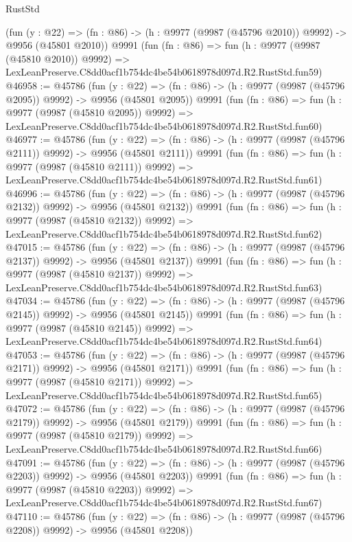 \begin{lexlean}{RustStd}
\begin{coremodule}
    (fun (y : @22) =>
    (fn : @86) -> (h : @9977 (@9987 (@45796 @2010)) @9992) -> @9956 (@45801 @2010))
    @9991
    (fun (fn : @86) =>
    fun (h : @9977 (@9987 (@45810 @2010)) @9992) =>
    LexLeanPreserve.C8dd0acf1b754dc4be54b0618978d097d.R2.RustStd.fun59)
@46958 := @45786
    (fun (y : @22) =>
    (fn : @86) -> (h : @9977 (@9987 (@45796 @2095)) @9992) -> @9956 (@45801 @2095))
    @9991
    (fun (fn : @86) =>
    fun (h : @9977 (@9987 (@45810 @2095)) @9992) =>
    LexLeanPreserve.C8dd0acf1b754dc4be54b0618978d097d.R2.RustStd.fun60)
@46977 := @45786
    (fun (y : @22) =>
    (fn : @86) -> (h : @9977 (@9987 (@45796 @2111)) @9992) -> @9956 (@45801 @2111))
    @9991
    (fun (fn : @86) =>
    fun (h : @9977 (@9987 (@45810 @2111)) @9992) =>
    LexLeanPreserve.C8dd0acf1b754dc4be54b0618978d097d.R2.RustStd.fun61)
@46996 := @45786
    (fun (y : @22) =>
    (fn : @86) -> (h : @9977 (@9987 (@45796 @2132)) @9992) -> @9956 (@45801 @2132))
    @9991
    (fun (fn : @86) =>
    fun (h : @9977 (@9987 (@45810 @2132)) @9992) =>
    LexLeanPreserve.C8dd0acf1b754dc4be54b0618978d097d.R2.RustStd.fun62)
@47015 := @45786
    (fun (y : @22) =>
    (fn : @86) -> (h : @9977 (@9987 (@45796 @2137)) @9992) -> @9956 (@45801 @2137))
    @9991
    (fun (fn : @86) =>
    fun (h : @9977 (@9987 (@45810 @2137)) @9992) =>
    LexLeanPreserve.C8dd0acf1b754dc4be54b0618978d097d.R2.RustStd.fun63)
@47034 := @45786
    (fun (y : @22) =>
    (fn : @86) -> (h : @9977 (@9987 (@45796 @2145)) @9992) -> @9956 (@45801 @2145))
    @9991
    (fun (fn : @86) =>
    fun (h : @9977 (@9987 (@45810 @2145)) @9992) =>
    LexLeanPreserve.C8dd0acf1b754dc4be54b0618978d097d.R2.RustStd.fun64)
@47053 := @45786
    (fun (y : @22) =>
    (fn : @86) -> (h : @9977 (@9987 (@45796 @2171)) @9992) -> @9956 (@45801 @2171))
    @9991
    (fun (fn : @86) =>
    fun (h : @9977 (@9987 (@45810 @2171)) @9992) =>
    LexLeanPreserve.C8dd0acf1b754dc4be54b0618978d097d.R2.RustStd.fun65)
@47072 := @45786
    (fun (y : @22) =>
    (fn : @86) -> (h : @9977 (@9987 (@45796 @2179)) @9992) -> @9956 (@45801 @2179))
    @9991
    (fun (fn : @86) =>
    fun (h : @9977 (@9987 (@45810 @2179)) @9992) =>
    LexLeanPreserve.C8dd0acf1b754dc4be54b0618978d097d.R2.RustStd.fun66)
@47091 := @45786
    (fun (y : @22) =>
    (fn : @86) -> (h : @9977 (@9987 (@45796 @2203)) @9992) -> @9956 (@45801 @2203))
    @9991
    (fun (fn : @86) =>
    fun (h : @9977 (@9987 (@45810 @2203)) @9992) =>
    LexLeanPreserve.C8dd0acf1b754dc4be54b0618978d097d.R2.RustStd.fun67)
@47110 := @45786
    (fun (y : @22) =>
    (fn : @86) -> (h : @9977 (@9987 (@45796 @2208)) @9992) -> @9956 (@45801 @2208))

\end{coremodule}
\end{lexlean}
